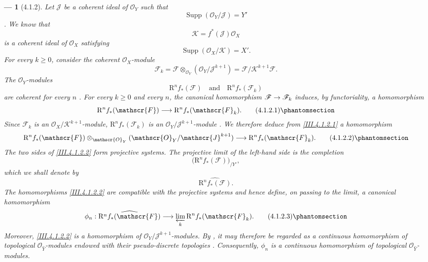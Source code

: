 \documentclass[oneside]{amsart}
\theoremstyle{ega-env-style}
\newtheorem*{env}{---}
\theoremstyle{ega-thm-env-style}
\theoremstyle{ega-defn-env-style}
\def\mathcal{\mathscr}
\def\sh{\mathcal}                   %
\def\geq{\geqslant}                 %
\def\vphi{\phi}                     %
\def\RR{\mathrm{R}}                 %
\def\Supp{\operatorname{Supp}}
\renewcommand{\to}{\mathchoice{\longrightarrow}{\rightarrow}{\rightarrow}{\rightarrow}}
\let\EGAOriginalLabel\label
\renewcommand{\label}[1]{\phantomsection\EGAOriginalLabel{#1}}
\begin{document}
\begin{env}[4.1.2]
\label{III.4.1.2}
Let $\sh{J}$ be a coherent ideal of $\sh{O}_Y$ such that
\[
  \Supp(\sh{O}_Y/\sh{J})=Y'
\]
.
We know  that
\[
  \sh{K}=f^*(\sh{J})\sh{O}_X
\]
is a coherent ideal of $\sh{O}_X$ satisfying
\[
  \Supp(\sh{O}_X/\sh{K})=X'.
\]
For every $k\geq0$, consider the coherent $\sh{O}_X$-module
\[
  \sh{F}_k
  =
  \sh{F}\otimes_{\sh{O}_Y}(\sh{O}_Y/\sh{J}^{k+1})
  =
  \sh{F}/\sh{K}^{k+1}\sh{F}.
\]
The $\sh{O}_Y$-modules
\[
  \RR^n f_*(\sh{F})
  \quad\text{and}\quad
  \RR^n f_*(\sh{F}_k)
\]
are coherent for every $n$ .
For every $k\geq0$ and every $n$, the canonical homomorphism
$\sh{F}\to\sh{F}_k$ induces, by functoriality, a homomorphism
\[
  \RR^n f_*(\sh{F})
  \longrightarrow
  \RR^n f_*(\sh{F}_k).
  \tag{4.1.2.1}
  \label{III.4.1.2.1}
\]
Since $\sh{F}_k$ is an $\sh{O}_X/\sh{K}^{k+1}$-module,
$\RR^n f_*(\sh{F}_k)$ is an
$\sh{O}_Y/\sh{J}^{k+1}$-module .
We therefore deduce from \eqref{III.4.1.2.1} a homomorphism
\[
  \RR^n f_*(\sh{F})
  \otimes_{\sh{O}_Y}(\sh{O}_Y/\sh{J}^{k+1})
  \longrightarrow
  \RR^n f_*(\sh{F}_k).
  \tag{4.1.2.2}
  \label{III.4.1.2.2}
\]
The two sides of \eqref{III.4.1.2.2} form projective systems.
The projective limit of the left-hand side is the completion
\[
  \bigl(\RR^n f_*(\sh{F})\bigr)_{/Y'},
\]
which we shall denote by
\[
  \widehat{\RR^n f_*(\sh{F})}.
\]
The homomorphisms \eqref{III.4.1.2.2} are compatible with the projective
systems and hence define, on passing to the limit, a canonical
homomorphism
\[
  \vphi_n:
  \widehat{\RR^n f_*(\sh{F})}
  \longrightarrow
  \varprojlim_k\RR^n f_*(\sh{F}_k).
  \tag{4.1.2.3}
  \label{III.4.1.2.3}
\]
Moreover, \eqref{III.4.1.2.2} is a homomorphism of
$\sh{O}_Y/\sh{J}^{k+1}$-modules.
By , it may therefore be regarded as a continuous
homomorphism of topological $\sh{O}_{\widehat{Y}}$-modules endowed with
their pseudo-discrete topologies .
Consequently, $\vphi_n$ is a continuous homomorphism of topological
$\sh{O}_{\widehat{Y}}$-modules.
\end{env}
\end{document}
